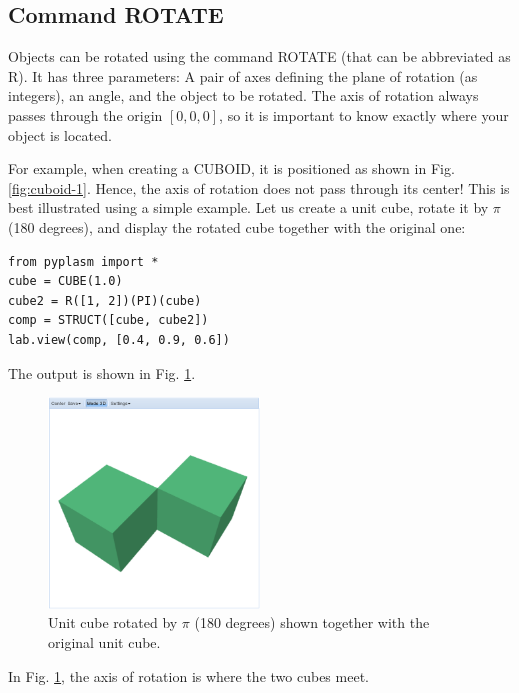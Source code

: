 \documentclass{article}
\begin{document}
\subsection{Command ROTATE}

Objects can be rotated using the command ROTATE (that
can be abbreviated as R). It has three parameters:
A pair of axes defining the plane of rotation (as integers),
an angle, and the object to be rotated. The axis of rotation 
always passes through the origin $[0, 0, 0]$, so it is important 
to know exactly where your object is located. 

For example, when creating 
a CUBOID, it is positioned as shown in Fig. \ref{fig:cuboid-1}.
Hence, the axis of rotation does not pass through its center!
This is best illustrated using a simple example. Let us create 
a unit cube, rotate it by $\pi$ (180 degrees), and display 
the rotated cube together with the original one:

\begin{verbatim}
from pyplasm import *
cube = CUBE(1.0)
cube2 = R([1, 2])(PI)(cube)
comp = STRUCT([cube, cube2])
lab.view(comp, [0.4, 0.9, 0.6])
\end{verbatim}
The output is shown in Fig. \ref{fig:rot-1}.

\newpage

\begin{figure}[!ht]
\begin{center}
\includegraphics[width=0.5\textwidth]{img/rot-1.png}
\end{center}
\vspace{-2mm}
\caption{Unit cube rotated by $\pi$ (180 degrees) shown together with the original unit cube.}
\label{fig:rot-1}
\end{figure}
\noindent
In Fig. \ref{fig:rot-1}, the axis of rotation is where the two cubes meet. 
\end{document}
